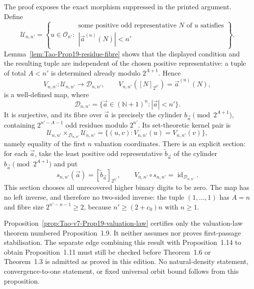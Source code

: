 The proof exposes the exact morphism suppressed in the printed argument.
Define
\[
 \mathcal U_{n,n'}=
 \left\{u\in\mathcal O_{n'}:
 \begin{array}{l}
 \text{some positive odd representative \(N\) of \(u\) satisfies}\\[-2pt]
 |\vec a^{(n)}(N)|<n'
 \end{array}\right\}.
\]
Lemma~\ref{lem:Tao-Prop19-residue-fibre} shows that the displayed condition
and the resulting tuple are independent of the chosen positive
representative: a tuple of total \(A<n'\) is determined already modulo
\(2^{A+1}\).  Hence
\[
 V_{n,n'}:\mathcal U_{n,n'}\longrightarrow\mathcal D_{n,n'},
 \qquad
 V_{n,n'}([N]_{2^{n'}})=\vec a^{(n)}(N),
\]
is a well-defined map, where
\[
 \mathcal D_{n,n'}=
 \{\vec a\in(\mathbb N+1)^n:|\vec a|<n'\}.
\]
It is surjective, and its fibre over \(\vec a\) is precisely the cylinder
\(b_{\vec a}\pmod{2^{A+1}}\), containing
\(2^{n'-A-1}\) odd residues modulo \(2^{n'}\).  Its set-theoretic kernel pair
is
\[
 \mathcal U_{n,n'}\mathbin{\times_{\mathcal D_{n,n'}}}\mathcal U_{n,n'}
 =\{(u,v):V_{n,n'}(u)=V_{n,n'}(v)\},
\]
namely equality of the first \(n\) valuation coordinates.  There is an
explicit section: for each \(\vec a\), take the least positive odd
representative \(\widetilde b_{\vec a}\) of the cylinder
\(b_{\vec a}\pmod{2^{A+1}}\) and put
\[
 s_{n,n'}(\vec a)=[\widetilde b_{\vec a}]_{2^{n'}},
 \qquad V_{n,n'}\circ s_{n,n'}=\operatorname{id}_{\mathcal D_{n,n'}}.
\]
This section chooses all unrecovered higher binary digits to be zero.  The map
has no left inverse, and therefore no two-sided inverse: the tuple
\((1,\ldots,1)\) has \(A=n\) and fibre size
\(2^{n'-n-1}\geq2\), because
\(n'\geq(2+c_0)n\) with \(n\geq1\).

\begin{nonclaim}
Proposition~\ref{prop:Tao-v7-Prop19-valuation-law} certifies only the
valuation-law theorem numbered Proposition~1.9.  It neither assumes nor
proves first-passage stabilisation.  The separate edge combining this result
with Proposition~1.14 to obtain Proposition~1.11 must still be checked before
Theorem~1.6 or Theorem~1.3 is admitted as proved in this edition.  No
natural-density statement, convergence-to-one statement, or fixed universal
orbit bound follows from this proposition.
\end{nonclaim}
